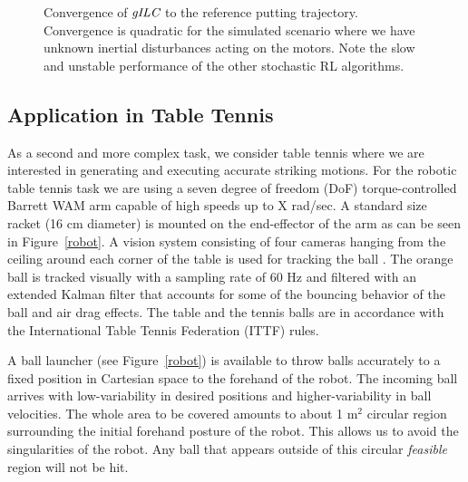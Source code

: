 
\begin{figure}
\center
\newlength\figureheight 
\newlength\figurewidth 
\setlength\figureheight{6cm}  
\setlength\figurewidth{6cm} 
\scalebox{1.0}{}
\caption{Convergence of $\emph{gILC}$ to the reference putting trajectory. Convergence is quadratic for the simulated scenario where we have unknown inertial disturbances acting on the motors. Note the slow and unstable performance of the other stochastic RL algorithms.}
\label{ILCTrajectoryPutting}
\end{figure}

\subsection{Application in Table Tennis}


As a second and more complex task, we consider table tennis where we are interested in generating and executing accurate striking motions. For the robotic table tennis task we are using a seven degree of freedom (DoF) torque-controlled Barrett WAM arm capable of high speeds up to X rad/sec. A standard size racket (16 cm diameter) is mounted on the end-effector of the arm as can be seen in Figure~\ref{robot}. A vision system consisting of four cameras hanging from the ceiling around each corner of the table is used for tracking the ball \cite{Lampert12}. The orange ball is tracked  visually with a sampling rate of 60 Hz and filtered with an extended Kalman filter that accounts for some of the bouncing behavior of the ball and air drag effects. The table and the tennis balls are in accordance with the International Table Tennis Federation (ITTF) rules.

A ball launcher (see Figure~\ref{robot}) is available to throw balls accurately to a fixed position in Cartesian space to the forehand of the robot. The incoming ball arrives with low-variability in desired positions and higher-variability in ball velocities. The whole area to be covered amounts to about 1 m$^2$ circular region surrounding the initial forehand posture of the robot. This allows us to avoid the singularities of the robot. Any ball that appears outside of this circular \emph{feasible} region will not be hit.

